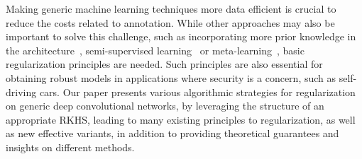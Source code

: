 
Making generic machine learning techniques more data efficient is crucial to
reduce the costs related to annotation. While other approaches may also be
important to solve this challenge, such as incorporating more prior
knowledge in the architecture~\citep[\eg,][]{oyallon2017scaling},
semi-supervised learning~\citep{chapelle06semi} or
meta-learning~\citep[when multiple tasks or datasets are available, see, \eg,][]{thrun1998lifelong},
basic regularization principles are needed.
Such principles are also essential for obtaining robust models in applications where
security is a concern, such as self-driving cars.
Our paper presents various algorithmic strategies for regularization on generic deep
convolutional networks, by leveraging the structure of an appropriate RKHS,
leading to many existing principles to regularization, as well as new effective variants,
in addition to providing theoretical guarantees and insights on different methods.

